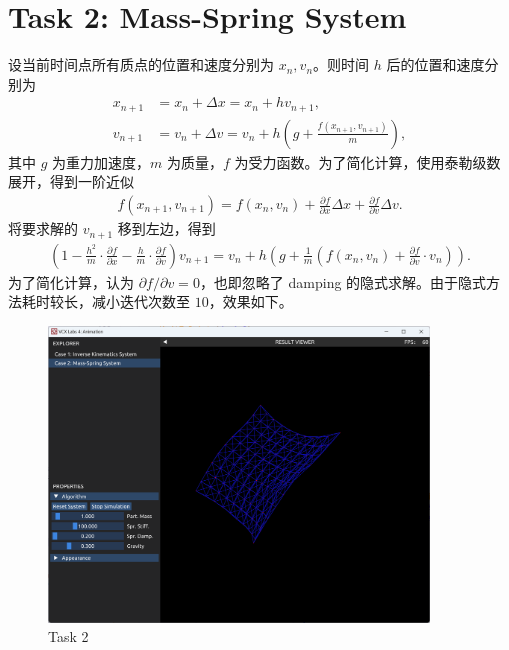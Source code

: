 \documentclass[UTF8]{ctexart}
\begin{document}
\section*{Task 2: Mass-Spring System}

设当前时间点所有质点的位置和速度分别为 $x_n, v_n$。则时间 $h$ 后的位置和速度分别为
\begin{align*}
    x_{n+1} &= x_n + \Delta x = x_n + h v_{n+1}, \\
    v_{n+1} &= v_n + \Delta v = v_n + h \left(g + \frac{f(x_{n+1}, v_{n+1})}{m}\right),
\end{align*}
其中 $g$ 为重力加速度，$m$ 为质量，$f$ 为受力函数。为了简化计算，使用泰勒级数展开，得到一阶近似
\begin{align*}
    f(x_{n+1}, v_{n+1}) = f(x_n, v_n) + \frac{\partial f}{\partial x} \Delta x + \frac{\partial f}{\partial v} \Delta v.
\end{align*}
将要求解的 $v_{n+1}$ 移到左边，得到
\begin{align*}
    \left(1 - \frac{h^2}{m} \cdot \frac{\partial f}{\partial x} - \frac{h}{m} \cdot \frac{\partial f}{\partial v}\right) v_{n+1} = v_n + h \left(g + \frac{1}{m}\left(f(x_n, v_n) + \frac{\partial f}{\partial v} \cdot v_n\right)\right).
\end{align*}
为了简化计算，认为 $\partial f / \partial v = 0$，也即忽略了 damping 的隐式求解。由于隐式方法耗时较长，减小迭代次数至 $10$，效果如下。

\begin{figure}[htbp]
    \centering
    \includegraphics[width=0.9\textwidth]{images/2-1.png}
    \caption*{Task 2}
\end{figure}
\end{document}
